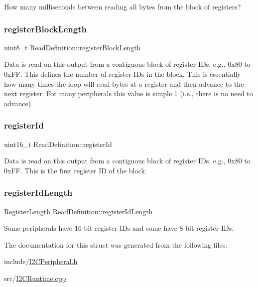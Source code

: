 How many milliseconds between reading all bytes from the block of registers? \mbox{\label{struct_read_definition_a0b480fa0fee8d4651383ec6cf48bd7f0}} 
\subsubsection{\texorpdfstring{register\+Block\+Length}{registerBlockLength}}
{\footnotesize\ttfamily uint8\+\_\+t Read\+Definition\+::register\+Block\+Length}

Data is read on this output from a contiguous block of register I\+Ds. e.\+g., 0x80 to 0x\+FF. This defines the number of register I\+Ds in the block. This is essentially how many times the loop will read bytes at a register and then advance to the next register. For many peripherals this value is simple 1 (i.\+e., there is no need to advance). \mbox{\label{struct_read_definition_af46d93354ce1dc2f413439b41b46eaa1}} 
\subsubsection{\texorpdfstring{register\+Id}{registerId}}
{\footnotesize\ttfamily uint16\+\_\+t Read\+Definition\+::register\+Id}

Data is read on this output from a contiguous block of register I\+Ds. e.\+g., 0x80 to 0x\+FF. This is the first register ID of the block. \mbox{\label{struct_read_definition_a842c09b580d962b7c8b8ce979c25c0e7}} 
\subsubsection{\texorpdfstring{register\+Id\+Length}{registerIdLength}}
{\footnotesize\ttfamily \mbox{\hyperlink{_i2_c_peripheral_8h_ae0efcb4a72d88c76f03e57ed26b03383}{Register\+Length}} Read\+Definition\+::register\+Id\+Length}

Some peripherals have 16-\/bit register I\+Ds and some have 8-\/bit register I\+Ds. 

The documentation for this struct was generated from the following files\+:\begin{DoxyCompactItemize}
\item 
include/\mbox{\hyperlink{_i2_c_peripheral_8h}{I2\+C\+Peripheral.\+h}}\item 
src/\mbox{\hyperlink{_i2_c_runtime_8cpp}{I2\+C\+Runtime.\+cpp}}\end{DoxyCompactItemize}
